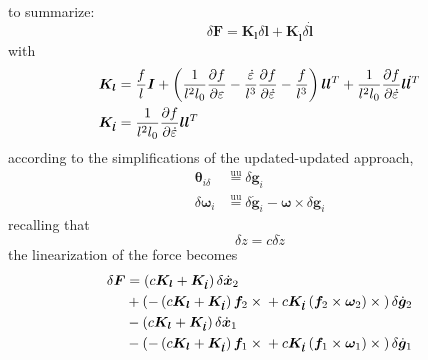 \documentclass[10pt,dvips,fleqn,subeqn]{report}
\newcommand{\T}[1]{\bm{#1}}
\newcommand{\equu}{\overset{\text{uu}}{=}}
\begin{document}
to summarize:
\begin{equation}
	\delta\T{F} = \T{K}_{\T{l}} \delta\T{l} + \T{K}_{\dot{\T{l}}} \delta\dot{\T{l}}
\end{equation}
with
\begin{subequations}
\begin{align}
	\T{K}_{\T{l}} &= \frac{f}{l} \T{I}
		+ \plbr{
			\frac{1}{l^2 l_0} \frac{\partial{f}}{\partial\varepsilon}
			- \frac{\dot{\varepsilon}}{l^3} \frac{\partial{f}}{\partial\dot{\varepsilon}}
			- \frac{f}{l^3}
		}\T{l}\T{l}^T
		+ \frac{1}{l^2 l_0} \frac{\partial{f}}{\partial\dot{\varepsilon}} \T{l}\dot{\T{l}}^T \\
	\T{K}_{\dot{\T{l}}} &= \frac{1}{l^2 l_0} \frac{\partial{f}}{\partial\dot{\varepsilon}} \T{l}\T{l}^T
\end{align}
\end{subequations}
according to the simplifications of the updated-updated approach,
\begin{subequations}
\begin{align}
	\T{\theta}_{i\delta} &\equu \delta\T{g}_i \\
	\delta\T{\omega}_i &\equu \delta\dot{\T{g}}_i - \T{\omega}\times\delta\T{g}_i
\end{align}
\end{subequations}
recalling that
\begin{equation}
	\delta{z} = c \delta\dot{z}
\end{equation}
the linearization of the force becomes
\begin{align}
	\delta\T{F} &= \plbr{c\T{K}_{\T{l}} + \T{K}_{\dot{\T{l}}}} \delta\dot{\T{x}}_2
		\nonumber \\
		& + \plbr{
			- \plbr{c\T{K}_{\T{l}} + \T{K}_{\dot{\T{l}}}} \T{f}_2\times{}
			+ c \T{K}_{\dot{\T{l}}} \plbr{\T{f}_2 \times \T{\omega}_2}\times{}
		} \delta\dot{\T{g}}_2
		\nonumber \\
		& - \plbr{c\T{K}_{\T{l}} + \T{K}_{\dot{\T{l}}}} \delta\dot{\T{x}}_1
		\nonumber \\
		& - \plbr{
			- \plbr{c\T{K}_{\T{l}} + \T{K}_{\dot{\T{l}}}} \T{f}_1\times{}
			+ c \T{K}_{\dot{\T{l}}} \plbr{\T{f}_1 \times \T{\omega}_1}\times{}
		} \delta\dot{\T{g}}_1
\end{align}
\end{document}
